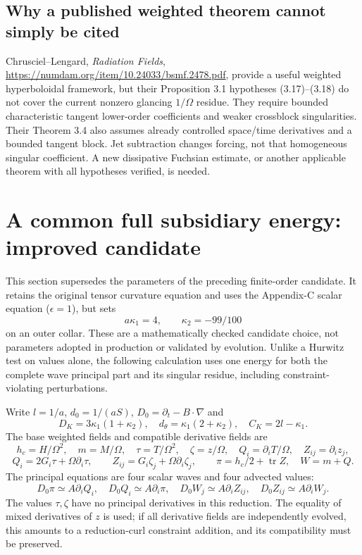 \documentclass[11pt]{article}
\newcommand{\Tr}{\operatorname{tr}}
\begin{document}
\subsection{Why a published weighted theorem cannot simply be cited}
Chrusciel--Lengard, \emph{Radiation Fields},
\url{https://numdam.org/item/10.24033/bsmf.2478.pdf},
provide a useful weighted hyperboloidal framework, but their
Proposition 3.1 hypotheses (3.17)--(3.18) do not cover the current
nonzero glancing $1/\Omega$ residue. They require bounded characteristic
tangent lower-order coefficients and weaker crossblock singularities.
Their Theorem 3.4 also assumes already controlled space/time derivatives
and a bounded tangent block. Jet subtraction changes forcing, not that
homogeneous singular coefficient. A new dissipative Fuchsian estimate,
or another applicable theorem with all hypotheses verified, is needed.

\section{A common full subsidiary energy: improved candidate}
This section supersedes the parameters of the preceding finite-order
candidate. It retains the original tensor curvature equation and uses
the Appendix-C scalar equation ($\epsilon=1$), but sets
\[
\boxed{a\kappa_1=4,\qquad \kappa_2=-99/100}
\]
on an outer collar. These are a mathematically checked candidate
choice, not parameters adopted in production or validated by evolution.
Unlike a Hurwitz test on values alone, the following calculation uses
one energy for both the complete wave principal part and its singular
residue, including constraint-violating perturbations.

Write $l=1/a$, $d_0=1/(aS)$, $D_0=\partial_t-B\cdot\nabla$ and
\[
D_K=3\kappa_1(1+\kappa_2),\quad
d_\theta=\kappa_1(2+\kappa_2),\quad C_K=2l-\kappa_1.
\]
The base weighted fields and compatible derivative fields are
\[
h_c=H/\Omega^2,\quad m=M/\Omega,\quad
\tau=T/\Omega^2,\quad \zeta=z/\Omega,\quad
Q_i=\partial_iT/\Omega,\quad Z_{ij}=\partial_i z_j,
\]
\[
Q_i=2G_i\tau+\Omega\partial_i\tau,\qquad
Z_{ij}=G_i\zeta_j+\Omega\partial_i\zeta_j,\qquad
\pi=h_c/2+\Tr Z,\quad W=m+Q .
\]
The principal equations are four scalar waves and four advected values:
\[
D_0\pi\simeq A\partial_iQ_i,\quad
D_0Q_i\simeq A\partial_i\pi,\quad
D_0W_j\simeq A\partial_iZ_{ij},\quad
D_0Z_{ij}\simeq A\partial_iW_j.
\]
The values $\tau,\zeta$ have no principal derivatives in this reduction.
The equality of mixed derivatives of $z$ is used; if all derivative
fields are independently evolved, this amounts to a reduction-curl
constraint addition, and its compatibility must be preserved.
\end{document}
